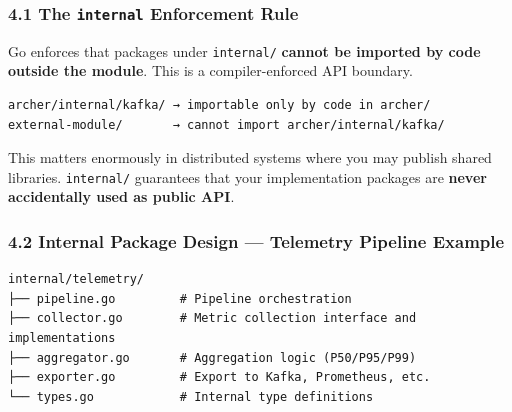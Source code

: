 \documentclass[11pt,openany]{book}
\begin{document}
\hypertarget{the-internal-enforcement-rule}{%
\subsubsection{\texorpdfstring{4.1 The \texttt{internal} Enforcement
Rule}{4.1 The internal Enforcement Rule}}\label{the-internal-enforcement-rule}}

Go enforces that packages under \texttt{internal/} \textbf{cannot be
imported by code outside the module}. This is a compiler-enforced API
boundary.

\begin{verbatim}
archer/internal/kafka/ → importable only by code in archer/
external-module/       → cannot import archer/internal/kafka/
\end{verbatim}

This matters enormously in distributed systems where you may publish
shared libraries. \texttt{internal/} guarantees that your implementation
packages are \textbf{never accidentally used as public API}.

\hypertarget{internal-package-design-telemetry-pipeline-example}{%
\subsubsection{4.2 Internal Package Design --- Telemetry Pipeline
Example}\label{internal-package-design-telemetry-pipeline-example}}

\begin{verbatim}
internal/telemetry/
├── pipeline.go         # Pipeline orchestration
├── collector.go        # Metric collection interface and implementations
├── aggregator.go       # Aggregation logic (P50/P95/P99)
├── exporter.go         # Export to Kafka, Prometheus, etc.
└── types.go            # Internal type definitions
\end{verbatim}
\end{document}
